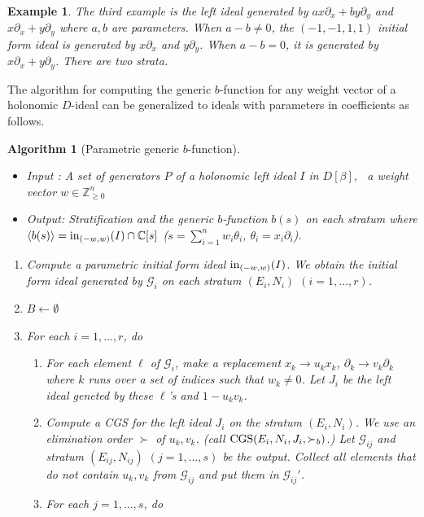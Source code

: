 \documentclass{article}
\def\CC{\mathbb{C}}
\def\ZZ{\mathbb{Z}}
\def\pd#1{\partial_{#1}}
\def\CGS{{\rm CGS}}
\newtheorem{example}{Example}
\newtheorem{algorithm}{Algorithm}
\begin{document}
\begin{example}
The third example is the left ideal generated by
$a x \pd{x} + b y \pd{y}$ and $x \pd{x}+y\pd{y}$
where $a, b$ are parameters.
When $a-b \not= 0$, the $(-1,-1,1,1)$ initial form ideal is generated
by $x \pd{x}$ and $y \pd{y}$.
When $a-b=0$, it is generated by $x \pd{x}+y\pd{y}$.
There are two strata.
\end{example}

The algorithm \cite[Th.5.1.6.]{SST} for computing the generic $b$-function for any weight vector of a holonomic $D$-ideal can be generalized to ideals with parameters in coefficients as follows.

\begin{algorithm}[Parametric generic $b$-function] \rm \label{alg:CGS-bf}
~ 
\begin{itemize}
\item 
Input :  A set of generators $P$ 
of a holonomic left ideal $I$ in $D[\beta]$,~ a weight vector $w \in \ZZ_{\geq 0}^n$
\item
Output: Stratification and the generic $b$-function $b(s)$  on each stratum where
$\langle b(s) \rangle = {\rm in}_{(-w,w)}(I) \cap \CC[s]$ ($s = \sum_{i=1}^n w_i \theta_i$, $\theta_i=x_i \pd{i}$). 
\end{itemize}
\begin{enumerate}
\item 
Compute a parametric initial form ideal ${\rm in}_{(-w,w)}(I)$.
We obtain
the initial form ideal generated by $\mathcal{G}_i$
on each stratum $(E_i, N_i)$ $(i = 1, \ldots, r)$.
\item 
$B \leftarrow \emptyset$ %
\item 
For each $i = 1, \ldots, r$, do
	\begin{enumerate}
	\item[3.1] 
	For each element $\ell$ of $\mathcal{G}_i$,
	make a replacement $x_k \rightarrow u_k x_k$, $\pd{k} \rightarrow v_k \pd{k}$
        where $k$ runs over a set of indices such that $w_k \neq 0$.
        Let $J_i$ be the left ideal geneted by these $\ell$'s and $1 - u_k v_k$.
	\item[3.2] 
	Compute a CGS for the left ideal $J_i$ on the stratum $(E_i, N_i)$.
         We use an elimination order $\succ$ of $u_k, v_k$.
         (call $\CGS(E_i,N_i,J_i, \succ_b)$.)
	Let $\mathcal{G}_{ij}$ and stratum $(E_{ij}, N_{ij})$ $(j = 1, \ldots, s)$ be the output.
    Collect all elements that do not contain $u_k, v_k$
    from $\mathcal{G}_{ij}$ and put them in $\mathcal{G}_{ij}'$. 
	\item[4] 
	For each $j = 1, \ldots, s$, do

\end{enumerate}
\end{enumerate}
\end{algorithm}
\end{document}
